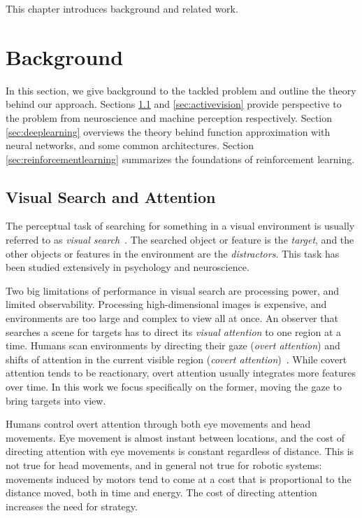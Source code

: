 This chapter introduces background and related work.

\section{Background}
\label{sec:background}

In this section, we give background to the tackled problem and outline the theory behind our approach.
Sections \ref{sec:visualsearch} and \ref{sec:activevision} provide perspective to the problem from neuroscience and machine perception respectively.
Section \ref{sec:deeplearning} overviews the theory behind function approximation with neural networks, and some common architectures.
Section \ref{sec:reinforcementlearning} summarizes the foundations of reinforcement learning.

\subsection{Visual Search and Attention}
\label{sec:visualsearch}

The perceptual task of searching for something in a visual environment is usually referred to as \textit{visual search}~\cite{wolfe_visual_2010}.
The searched object or feature is the \textit{target}, and the other objects or features in the environment are the \textit{distractors}.
This task has been studied extensively in psychology and neuroscience.

Two big limitations of performance in visual search are processing power, and limited observability.
Processing high-dimensional images is expensive, and environments are too large and complex to view all at once.
An observer that searches a scene for targets has to direct its \textit{visual attention} to one region at a time.
Humans scan environments by directing their gaze (\textit{overt attention}) and shifts of attention in the current visible region (\textit{covert attention})~\cite{itti_koch_2001}.
While covert attention tends to be reactionary, overt attention usually integrates more features over time.
In this work we focus specifically on the former, moving the gaze to bring targets into view.


Humans control overt attention through both eye movements and head movements.
Eye movement is almost instant between locations, and the cost of directing attention with eye movements is constant regardless of distance.
This is not true for head movements, and in general not true for robotic systems:
movements induced by motors tend to come at a cost that is proportional to the distance moved, both in time and energy.
The cost of directing attention increases the need for strategy.

